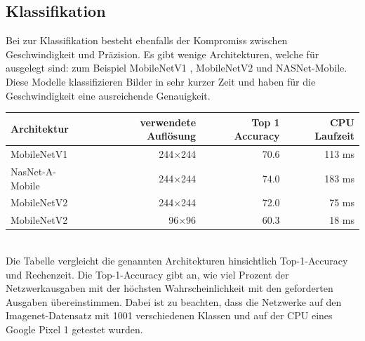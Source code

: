 \documentclass[12pt,a4paper,ngerman,enabledeprecatedfontcommands]{scrreprt}
\begin{document}
\subsection{Klassifikation}
Bei  zur \gls{Klassifikation} besteht ebenfalls der Kompromiss zwischen Geschwindigkeit und Präzision. Es gibt wenige Architekturen, welche für  ausgelegt sind: zum Beispiel MobileNetV1\cite{DBLP:journals/corr/HowardZCKWWAA17} , MobileNetV2\cite{DBLP:journals/corr/abs-1801-04381}  und NASNet-Mobile. Diese Modelle klassifizieren Bilder in sehr kurzer Zeit und haben für die Geschwindigkeit eine ausreichende Genauigkeit.\\

\begin{tabu}{|X[l]|r|r|r|}
\hline
Architektur & verwendete Auflösung & Top 1 Accuracy & CPU Laufzeit \\
\hline
MobileNetV1\cite{DBLP:journals/corr/HowardZCKWWAA17}    & 244$\times$244 & 70.6 & 113 ms \\
NasNet-A-Mobile & 244$\times$244 & 74.0 & 183 ms \\
MobileNetV2\cite{DBLP:journals/corr/abs-1801-04381}    & 244$\times$244 & 72.0 & 75 ms \\
MobileNetV2\cite{DBLP:journals/corr/abs-1801-04381}  &  96$\times$96\footnotemark[9] & 60.3 & 18 ms \\
\hline  
\end{tabu}~\\
Die Tabelle vergleicht die genannten Architekturen hinsichtlich Top-1-Accuracy und Rechenzeit. Die Top-1-Accuracy gibt an, wie viel Prozent der Netzwerkausgaben mit der höchsten Wahrscheinlichkeit mit den geforderten Ausgaben übereinstimmen. Dabei ist zu beachten, dass die Netzwerke auf den Imagenet\footnotemark[10]-Datensatz mit 1001 verschiedenen Klassen und auf der \gls{CPU} eines Google Pixel 1 getestet wurden.\\

\end{document}
